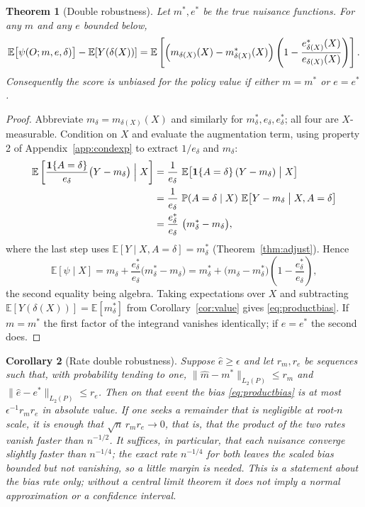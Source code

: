 \documentclass[11pt,a4paper]{article}
\theoremstyle{plain}
\newtheorem{theorem}{Theorem}[section]
\newtheorem{corollary}[theorem]{Corollary}
\theoremstyle{definition}
\theoremstyle{remark}
\newcommand{\E}{\mathbb E}
\newcommand{\Prob}{\mathbb P}
\newcommand{\one}[1]{\mathbf 1\{#1\}}
\begin{document}
\begin{theorem}[Double robustness]\label{thm:dr}
Let $m^\ast,e^\ast$ be the true nuisance functions. For any $m$ and any $e$ bounded below,
\begin{equation}
\E\bigl[\psi(O;m,e,\delta)\bigr]-\E[Y(\delta(X))]
=\E\left[\Bigl(m_{\delta(X)}(X)-m^\ast_{\delta(X)}(X)\Bigr)
\left(1-\frac{e^\ast_{\delta(X)}(X)}{e_{\delta(X)}(X)}\right)\right].
\label{eq:productbias}
\end{equation}
Consequently the score is unbiased for the policy value if \emph{either} $m=m^\ast$ \emph{or}
$e=e^\ast$.
\end{theorem}

\begin{proof}
Abbreviate $m_\delta=m_{\delta(X)}(X)$ and similarly for $m^\ast_\delta,e_\delta,e^\ast_\delta$;
all four are $X$-measurable. Condition on $X$ and evaluate the augmentation term, using property
2 of Appendix~\ref{app:condexp} to extract $1/e_\delta$ and $m_\delta$:
\begin{align*}
\E\left[\frac{\one{A=\delta}}{e_\delta}\bigl(Y-m_\delta\bigr)\Bigm| X\right]
&= \frac{1}{e_\delta}\ \E\bigl[\one{A=\delta}\,(Y-m_\delta)\bigm| X\bigr]\\
&= \frac{1}{e_\delta}\ \Prob(A=\delta\mid X)\ \E\bigl[Y-m_\delta\bigm| X, A=\delta\bigr]\\
&= \frac{e^\ast_\delta}{e_\delta}\ \bigl(m^\ast_\delta-m_\delta\bigr),
\end{align*}
where the last step uses $\E[Y\mid X,A=\delta]=m^\ast_\delta$ (Theorem~\ref{thm:adjust}). Hence
\[
\E[\psi\mid X]
= m_\delta+\frac{e^\ast_\delta}{e_\delta}\bigl(m^\ast_\delta-m_\delta\bigr)
= m^\ast_\delta+\bigl(m_\delta-m^\ast_\delta\bigr)\left(1-\frac{e^\ast_\delta}{e_\delta}\right),
\]
the second equality being algebra. Taking expectations over $X$ and subtracting
$\E[Y(\delta(X))]=\E[m^\ast_\delta]$ from Corollary~\ref{cor:value} gives \eqref{eq:productbias}.
If $m=m^\ast$ the first factor of the integrand vanishes identically; if $e=e^\ast$ the second
does.
\end{proof}

\begin{corollary}[Rate double robustness]\label{cor:rates}
Suppose $\hat e\ge\epsilon$ and let $r_m,r_e$ be sequences such that, with probability tending to
one, $\|\hat m-m^\ast\|_{L_2(P)}\le r_m$ and $\|\hat e-e^\ast\|_{L_2(P)}\le r_e$. Then on that
event the bias \eqref{eq:productbias} is at most $\epsilon^{-1}r_mr_e$ in absolute value.
If one seeks a remainder that is negligible at root-$n$ scale, it is enough that
$\sqrt n\,r_mr_e\to0$, that is, that the product of the two rates vanish faster than
$n^{-1/2}$. It suffices, in particular, that each nuisance converge slightly faster than
$n^{-1/4}$; the exact rate $n^{-1/4}$ for both leaves the scaled bias bounded but not vanishing,
so a little margin is needed. This is a statement about the bias rate only; without a central
limit theorem it does not imply a normal approximation or a confidence interval.
\end{corollary}
\end{document}
